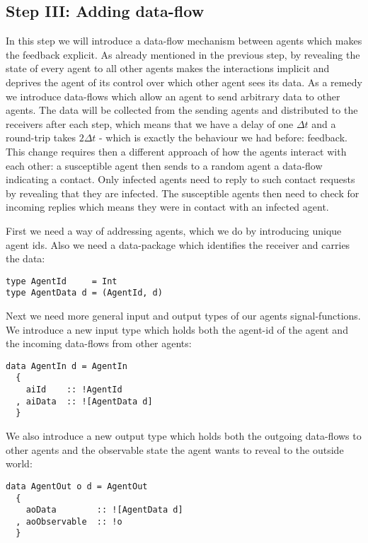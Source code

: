\subsection{Step III: Adding data-flow}
In this step we will introduce a data-flow mechanism between agents which makes the feedback explicit. As already mentioned in the previous step, by revealing the state of every agent to all other agents makes the interactions implicit and deprives the agent of its control over which other agent sees its data. 
As a remedy we introduce data-flows which allow an agent to send arbitrary data to other agents. The data will be collected from the sending agents and distributed to the receivers after each step, which means that we have a delay of one $\Delta t$ and a round-trip takes $2 \Delta t$ - which is exactly the behaviour we had before: feedback.
This change requires then a different approach of how the agents interact with each other: a susceptible agent then sends to a random agent a data-flow indicating a contact. Only infected agents need to reply to such contact requests by revealing that they are infected. The susceptible agents then need to check for incoming replies which means they were in contact with an infected agent.

First we need a way of addressing agents, which we do by introducing unique agent ids. Also we need a data-package which identifies the receiver and carries the data:
\begin{verbatim}
type AgentId     = Int
type AgentData d = (AgentId, d)
\end{verbatim}

Next we need more general input and output types of our agents signal-functions. We introduce a new input type which holds both the agent-id of the agent and the incoming data-flows from other agents:

\begin{verbatim}
data AgentIn d = AgentIn
  {
    aiId    :: !AgentId
  , aiData  :: ![AgentData d]
  } 
\end{verbatim}

We also introduce a new output type which holds both the outgoing data-flows to other agents and the observable state the agent wants to reveal to the outside world:

\begin{verbatim}
data AgentOut o d = AgentOut
  {
    aoData        :: ![AgentData d]
  , aoObservable  :: !o
  }
\end{verbatim}

